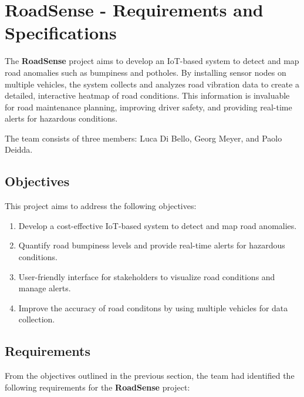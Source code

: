 \documentclass[12pt,a4paper]{article}
\begin{document}
\section*{RoadSense - Requirements and Specifications}

The \textbf{RoadSense} project aims to develop an IoT-based system to detect and map road anomalies such as bumpiness and potholes. By installing sensor nodes on multiple vehicles, the system collects and analyzes road vibration data to create a detailed, interactive heatmap of road conditions. This information is invaluable for road maintenance planning, improving driver safety, and providing real-time alerts for hazardous conditions.

The team consists of three members: Luca Di Bello, Georg Meyer, and Paolo Deidda.

\subsection*{Objectives}

This project aims to address the following objectives:

\begin{enumerate}
\item Develop a cost-effective IoT-based system to detect and map road anomalies.
\item Quantify road bumpiness levels and provide real-time alerts for hazardous conditions.
\item User-friendly interface for stakeholders to visualize road conditions and manage alerts.
\item Improve the accuracy of road conditons by using multiple vehicles for data collection.
\end{enumerate}

\subsection*{Requirements}

From the objectives outlined in the previous section, the team had identified the following requirements for the \textbf{RoadSense} project:
\end{document}
